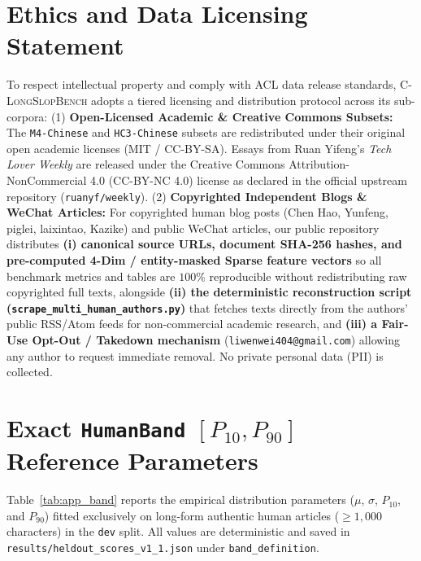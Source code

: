 \documentclass[11pt]{article}
\newcommand{\bench}{\textsc{C-LongSlopBench}}
\begin{document}
\section*{Ethics and Data Licensing Statement}
To respect intellectual property and comply with ACL data release standards, \bench{} adopts a tiered licensing and distribution protocol across its sub-corpora:
(1) \textbf{Open-Licensed Academic \& Creative Commons Subsets:} The \texttt{M4-Chinese} \cite{wang2024m4} and \texttt{HC3-Chinese} \cite{guo2023hc3} subsets are redistributed under their original open academic licenses (MIT / CC-BY-SA). Essays from Ruan Yifeng's \textit{Tech Lover Weekly} are released under the Creative Commons Attribution-NonCommercial 4.0 (CC-BY-NC 4.0) license as declared in the official upstream repository (\texttt{ruanyf/weekly}).
(2) \textbf{Copyrighted Independent Blogs \& WeChat Articles:} For copyrighted human blog posts (Chen Hao, Yunfeng, piglei, laixintao, Kazike) and public WeChat articles, our public repository distributes \textbf{(i) canonical source URLs, document SHA-256 hashes, and pre-computed 4-Dim / entity-masked Sparse feature vectors} so all benchmark metrics and tables are $100\%$ reproducible without redistributing raw copyrighted full texts, alongside \textbf{(ii) the deterministic reconstruction script (\texttt{scrape\_multi\_human\_authors.py})} that fetches texts directly from the authors' public RSS/Atom feeds for non-commercial academic research, and \textbf{(iii) a Fair-Use Opt-Out / Takedown mechanism} (\texttt{liwenwei404@gmail.com}) allowing any author to request immediate removal. No private personal data (PII) is collected.



\clearpage
\appendix

\section{Exact \texttt{HumanBand} $[P_{10}, P_{90}]$ Reference Parameters}
\label{sec:app_band}

Table~\ref{tab:app_band} reports the empirical distribution parameters ($\mu$, $\sigma$, $P_{10}$, and $P_{90}$) fitted exclusively on long-form authentic human articles ($\ge 1,000$ characters) in the \texttt{dev} split. All values are deterministic and saved in \texttt{results/heldout\_scores\_v1\_1.json} under \texttt{band\_definition}.
\end{document}

